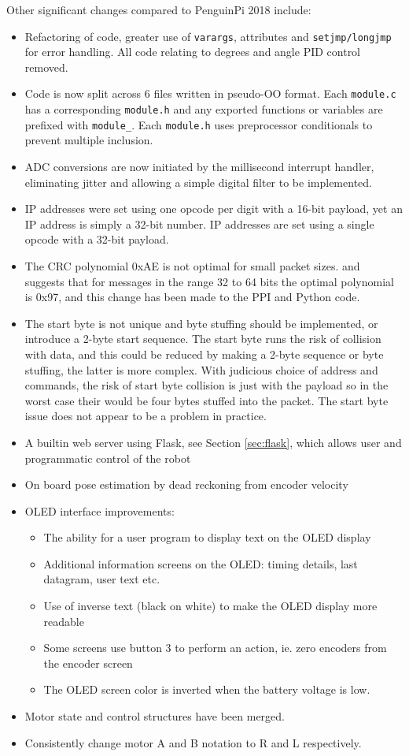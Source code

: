 \documentclass[11pt,fleqn]{article}
\begin{document}
Other significant changes compared to PenguinPi 2018 include:
\begin{itemize}
\item Refactoring of code, greater use of \texttt{varargs}, attributes and \texttt{setjmp/longjmp} for error handling.  All code relating to degrees and angle PID control removed.
\item Code is now split across 6 files written in pseudo-OO format.  Each \texttt{module.c} has a corresponding \texttt{module.h} and any
exported functions or variables are prefixed with \texttt{module\_}.  Each  \texttt{module.h} uses preprocessor conditionals to prevent multiple inclusion.

\item ADC conversions are now initiated by the millisecond interrupt handler, eliminating jitter and allowing a simple digital filter to be implemented.
\item IP addresses were set using one opcode per digit with a 16-bit payload, yet an IP address is simply a 32-bit number.
 IP addresses are set using a single opcode with a 32-bit payload.
\item The CRC polynomial 0xAE is not optimal for small packet sizes.  
\cite{Koopman04} and \cite{Koopman} suggests that for messages in the range 32 to 64 bits the optimal polynomial is 0x97, and this change
has been made to the PPI and Python code.  
\item The start byte is not unique and byte stuffing should be implemented, or
introduce a 2-byte start sequence. The start byte
runs the risk of collision with data, and this could be reduced by making a 2-byte sequence or byte stuffing, the latter is more complex.  With judicious choice of address and commands, the risk of start byte collision is just with the payload so in the worst case their would be
four bytes stuffed into the packet.
The start byte issue does not appear to be a problem in practice.

\item A builtin web server using Flask, see Section \ref{sec:flask}, which allows user and programmatic control of the robot
\item On board pose estimation by dead reckoning from encoder velocity
\item OLED interface improvements:
\begin{itemize}
\item The ability for a user program to display text on the OLED display
\item Additional information screens on the OLED: timing details, last datagram, user text etc.
\item Use of inverse text (black on white) to make the OLED display more readable
\item Some screens use button 3 to perform an action, ie. zero encoders from the encoder screen
\item The OLED screen color is inverted when the battery voltage is low.
\end{itemize}
\item Motor state and control structures have been merged.
\item Consistently change motor A and B notation to R and L respectively.
\end{itemize}
\end{document}
